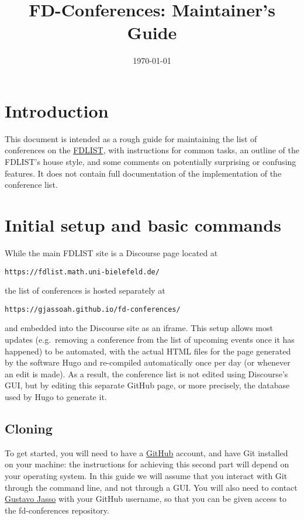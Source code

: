 \documentclass[12pt]{scrartcl}
\title{FD-Conferences: Maintainer's Guide}
\date{\today}
\theoremstyle{definition}
\begin{document}

\maketitle

\tableofcontents

\section{Introduction}

This document is intended as a rough guide for maintaining the list of conferences on the \href{https://fdlist.math.uni-bielefeld.de/}{FDLIST}, with instructions for common tasks, an outline of the FDLIST's house style, and some comments on potentially surprising or confusing features.
It does not contain full documentation of the implementation of the conference list.

\section{Initial setup and basic commands}

While the main FDLIST site is a Discourse page located at
\begin{center}
\verb|https://fdlist.math.uni-bielefeld.de/|
\end{center}
the list of conferences is hosted separately at
\begin{center}
\verb|https://gjassoah.github.io/fd-conferences/|
\end{center}
and embedded into the Discourse site as an iframe.
This setup allows most updates (e.g.\ removing a conference from the list of upcoming events once it has happened) to be automated, with the actual HTML files for the page generated by the software Hugo and re-compiled automatically once per day (or whenever an edit is made).
As a result, the conference list is not edited using Discourse's GUI, but by editing this separate GitHub page, or more precisely, the database used by Hugo to generate it.

\subsection{Cloning}
To get started, you will need to have a \href{https://github.com}{GitHub} account, and have Git installed on your machine: the instructions for achieving this second part will depend on your operating system.
In this guide we will assume that you interact with Git through the command line, and not through a GUI. You will also need to contact \href{mailto:gjasso@math.uni-koeln.de}{Gustavo Jasso} with your GitHub username, so that you can be given access to the fd-conferences repository.
\end{document}
